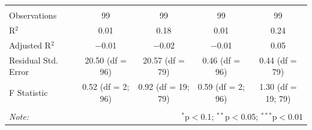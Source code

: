 \documentclass[]{article}
\begin{document}
\begin{table}[!htbp]
\begin{tabular}{@{\extracolsep{5pt}}lcccc}
  & & & & \\ 
\hline \\[-1.8ex] 
Observations & 99 & 99 & 99 & 99 \\ 
R$^{2}$ & 0.01 & 0.18 & 0.01 & 0.24 \\ 
Adjusted R$^{2}$ & $-$0.01 & $-$0.02 & $-$0.01 & 0.05 \\ 
Residual Std. Error & 20.50 (df = 96) & 20.57 (df = 79) & 0.46 (df = 96) & 0.44 (df = 79) \\ 
F Statistic & 0.52 (df = 2; 96) & 0.92 (df = 19; 79) & 0.59 (df = 2; 96) & 1.30 (df = 19; 79) \\ 
\hline 
\hline \\[-1.8ex] 
\textit{Note:}  & \multicolumn{4}{r}{$^{*}$p$<$0.1; $^{**}$p$<$0.05; $^{***}$p$<$0.01} \\ 
\end{tabular} 
\end{table}
\end{document}
